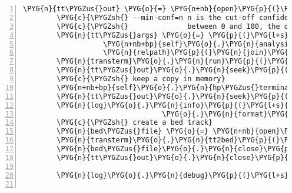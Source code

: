 \begin{Verbatim}[commandchars=\\\{\},numbers=left,firstnumber=1,stepnumber=5]
        \PYG{n}{tt\PYGZus{}out} \PYG{o}{=} \PYG{n+nb}{open}\PYG{p}{(}\PYG{l+s}{"}\PYG{l+s}{transterm\PYGZus{}hp.out}\PYG{l+s}{"}\PYG{p}{,} \PYG{l+s}{"}\PYG{l+s}{w+}\PYG{l+s}{"}\PYG{p}{)}
        \PYG{c}{\PYGZsh{} --min-conf=n n is the cut-off confidence value,}
        \PYG{c}{\PYGZsh{}              between 0 and 100, the default is 76}
        \PYG{n}{tt\PYGZus{}args} \PYG{o}{=} \PYG{p}{(}\PYG{l+s}{"}\PYG{l+s}{--min-conf=47}\PYG{l+s}{"}\PYG{p}{,}
                   \PYG{n+nb+bp}{self}\PYG{o}{.}\PYG{n}{analysis}\PYG{o}{.}\PYG{n}{genbankfile\PYGZus{}fa\PYGZus{}path}\PYG{p}{,}
                   \PYG{n}{relpath}\PYG{p}{(}\PYG{n}{join}\PYG{p}{(}\PYG{n+nb+bp}{self}\PYG{o}{.}\PYG{n}{analysis}\PYG{o}{.}\PYG{n}{genbank\PYGZus{}data\PYGZus{}dir}\PYG{p}{,} \PYG{l+s}{"}\PYG{l+s}{chr.ptt}\PYG{l+s}{"}\PYG{p}{)}\PYG{p}{)}\PYG{p}{)}
        \PYG{n}{transterm}\PYG{o}{.}\PYG{n}{run}\PYG{p}{(}\PYG{n}{tt\PYGZus{}args}\PYG{p}{,} \PYG{n}{out}\PYG{o}{=}\PYG{n}{tt\PYGZus{}out}\PYG{p}{,} \PYG{n}{err}\PYG{o}{=}\PYG{n+nb+bp}{self}\PYG{o}{.}\PYG{n}{logfile}\PYG{p}{)}
        \PYG{n}{tt\PYGZus{}out}\PYG{o}{.}\PYG{n}{seek}\PYG{p}{(}\PYG{l+m+mi}{0}\PYG{p}{)}
        \PYG{c}{\PYGZsh{} keep a copy in memory}
        \PYG{n+nb+bp}{self}\PYG{o}{.}\PYG{n}{hp\PYGZus{}terminators} \PYG{o}{=} \PYG{n+nb}{list}\PYG{p}{(}\PYG{n}{transterm}\PYG{o}{.}\PYG{n}{iterator}\PYG{p}{(}\PYG{n}{tt\PYGZus{}out}\PYG{p}{)}\PYG{p}{)}
        \PYG{n}{tt\PYGZus{}out}\PYG{o}{.}\PYG{n}{seek}\PYG{p}{(}\PYG{l+m+mi}{0}\PYG{p}{)}
        \PYG{n}{log}\PYG{o}{.}\PYG{n}{info}\PYG{p}{(}\PYG{l+s}{"}\PYG{l+s}{found \PYGZob{}0\PYGZcb{} possible hairpin terminators}\PYG{l+s}{"}
                                 \PYG{o}{.}\PYG{n}{format}\PYG{p}{(}\PYG{n+nb}{len}\PYG{p}{(}\PYG{n+nb+bp}{self}\PYG{o}{.}\PYG{n}{hp\PYGZus{}terminators}\PYG{p}{)}\PYG{p}{)}\PYG{p}{)}
        \PYG{c}{\PYGZsh{} create a bed track}
        \PYG{n}{bed\PYGZus{}file} \PYG{o}{=} \PYG{n+nb}{open}\PYG{p}{(}\PYG{l+s}{"}\PYG{l+s}{hp\PYGZus{}terminators.bed}\PYG{l+s}{"}\PYG{p}{,} \PYG{l+s}{"}\PYG{l+s}{w}\PYG{l+s}{"}\PYG{p}{)}
        \PYG{n}{transterm}\PYG{o}{.}\PYG{n}{tt2bed}\PYG{p}{(}\PYG{n}{tt\PYGZus{}out}\PYG{p}{,} \PYG{n}{bed\PYGZus{}file}\PYG{p}{)}
        \PYG{n}{bed\PYGZus{}file}\PYG{o}{.}\PYG{n}{close}\PYG{p}{(}\PYG{p}{)}
        \PYG{n}{tt\PYGZus{}out}\PYG{o}{.}\PYG{n}{close}\PYG{p}{(}\PYG{p}{)}

        \PYG{n}{log}\PYG{o}{.}\PYG{n}{debug}\PYG{p}{(}\PYG{l+s}{"}\PYG{l+s}{running bedToBigBed}\PYG{l+s}{"}\PYG{p}{)}


\end{Verbatim}
